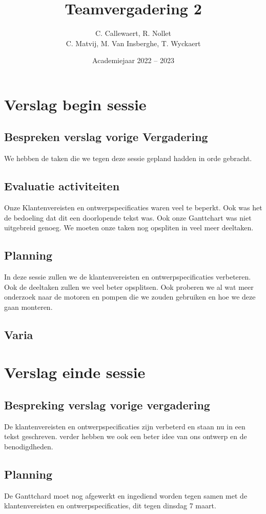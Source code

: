 \documentclass{kulakarticle}
\title{Teamvergadering 2}
\author{C. Callewaert, R. Nollet \\
	C. Matvij, M. Van Insberghe, T. Wyckaert }
\date{Academiejaar 2022 -- 2023}
\begin{document}
	\maketitle
	\section{Verslag begin sessie}
	
	\subsection{Bespreken verslag vorige Vergadering}
		We hebben de taken die we tegen deze sessie gepland hadden in orde gebracht. 
	\subsection{Evaluatie activiteiten}
	Onze Klantenvereisten en ontwerpspecificaties waren veel te beperkt. Ook was het de bedoeling dat dit een doorlopende tekst was. Ook onze Ganttchart was niet uitgebreid genoeg. We moeten onze taken nog opspliten in veel meer deeltaken.
	\subsection{Planning}
	In deze sessie zullen we de klantenvereisten en ontwerpspecificaties verbeteren. Ook de deeltaken zullen we veel beter opsplitsen. Ook proberen we al wat meer onderzoek naar de motoren en pompen die we zouden gebruiken en hoe we deze gaan monteren. 
	\subsection{Varia}
	
	\section{Verslag einde sessie}
	
	\subsection{Bespreking verslag vorige vergadering}
		De klantenvereisten en ontwerpspecificaties zijn verbeterd en staan nu in een tekst geschreven.
		verder hebben we ook een beter idee van ons ontwerp en de benodigdheden.
	\subsection{Planning}
	De Ganttchard moet nog afgewerkt en ingediend worden tegen samen met de klantenvereisten en ontwerpspecificaties, dit tegen dinsdag 7 maart.
	
	

	

	
\end{document}

